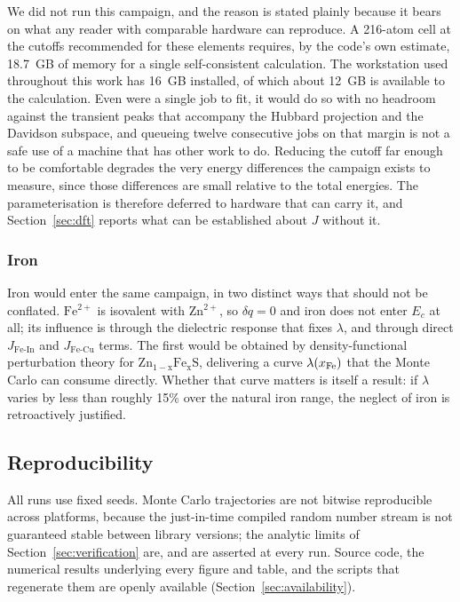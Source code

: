 \documentclass[11pt,a4paper]{article}
\begin{document}
We did not run this campaign, and the reason is stated plainly because it bears
on what any reader with comparable hardware can reproduce. A 216-atom cell at
the cutoffs recommended for these elements requires, by the code's own estimate,
18.7~GB of memory for a single self-consistent calculation. The workstation used
throughout this work has 16~GB installed, of which about 12~GB is available to
the calculation. Even were a single job to fit, it would do so with no headroom
against the transient peaks that accompany the Hubbard projection and the
Davidson subspace, and queueing twelve consecutive jobs on that margin is not a
safe use of a machine that has other work to do. Reducing the cutoff far enough
to be comfortable degrades the very energy differences the campaign exists to
measure, since those differences are small relative to the total energies. The parameterisation
is therefore deferred to hardware that can carry it, and Section~\ref{sec:dft}
reports what can be established about $J$ without it.

\subsubsection{Iron}

Iron would enter the same campaign, in two distinct ways that should not be
conflated. $\mathrm{Fe^{2+}}$ is isovalent with $\mathrm{Zn^{2+}}$, so
$\delta q = 0$ and iron does not enter $E_c$ at all; its influence is through
the dielectric response that fixes $\lambda$, and through direct
$J_{\mathrm{Fe\text{-}In}}$ and $J_{\mathrm{Fe\text{-}Cu}}$ terms. The first
would be obtained by density-functional perturbation theory for
$\mathrm{Zn_{1-x}Fe_xS}$, delivering a curve $\lambda(x_{\rm Fe})$ that the
Monte Carlo can consume directly. Whether that curve matters is itself a result:
if $\lambda$ varies by less than roughly 15\% over the natural iron range, the
neglect of iron is retroactively justified.

\subsection{Reproducibility}
\label{sec:repro}

All runs use fixed seeds. Monte Carlo trajectories are not bitwise reproducible
across platforms, because the just-in-time compiled random number stream is not
guaranteed stable between library versions; the analytic limits of
Section~\ref{sec:verification} are, and are asserted at every run. Source code,
the numerical results underlying every figure and table, and the scripts that
regenerate them are openly available (Section~\ref{sec:availability}).
\end{document}
